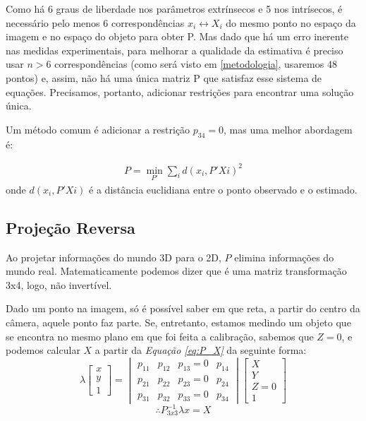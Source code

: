 \documentclass[conference]{IEEEtran}
\begin{document}
Como há 6 graus de liberdade nos parâmetros extrínsecos e 5 nos intrísecos, é necessário pelo menos 6 correspondências \({x_i \leftrightarrow X_i}\) do mesmo ponto no espaço da imagem e no espaço do objeto para obter P\cite{tese}. Mas dado que há um erro inerente nas medidas experimentais, para melhorar a qualidade da estimativa é preciso usar \(n > 6\) correspondências (como será visto em \ref{metodologia}, usaremos 48 pontos) e, assim, não há uma única matriz P que satisfaz esse sistema de equações. Precisamos, portanto, adicionar restrições para encontrar uma solução única.  

Um método comum é adicionar a restrição \(p_{34} = 0\)\cite{Hartley2004}, mas uma melhor abordagem\cite{tese} é:

\begin{equation}
\begin{aligned}
P = \min_{P'} \sum_{i}d(x_i, P'Xi)^2
\end{aligned}
\end{equation}
onde \(d(x_i, P'Xi) \) é a distância euclidiana entre o ponto observado e o estimado. 

\subsection{Projeção Reversa}
Ao projetar informações do mundo 3D para o 2D, \(P\) elimina informações do mundo real. Matematicamente podemos dizer que é uma matriz transformação 3x4, logo, não invertível. 

Dado um ponto na imagem, só é possível saber em que reta, a partir do centro da câmera, aquele ponto faz parte. Se, entretanto, estamos medindo um objeto que se encontra no mesmo plano em que foi feita a calibração, sabemos que \(Z=0\), e podemos calcular \(X\) a partir da \textit{Equação \ref{eq:P_X}} da seguinte forma:
\begin{equation}
\lambda  \begin{bmatrix} 
x \\
y \\
1
\end{bmatrix}
=
\begin{vmatrix} 
p_{11} & p_{12} & p_{13}=0& p_{14} \\
p_{21} & p_{22} & p_{23}=0& p_{24} \\
p_{31} & p_{32} & p_{33}=0& p_{34} 
\end{vmatrix}
\begin{bmatrix} 
X \\
Y \\
Z=0 \\
1
\end{bmatrix}
\end{equation}
\begin{equation}
\therefore  P_{3x3}^{-1} \lambda x = X
\end{equation}
\end{document}
